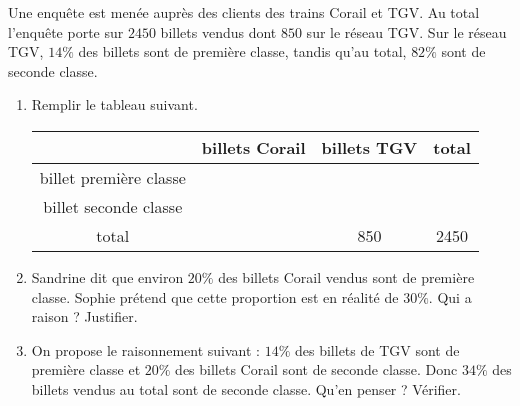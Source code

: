 
\begin{exercice}\label{exosmath-0089}

Une enquête est menée auprès des clients des trains Corail et TGV. Au total l'enquête porte sur \( 2450\) billets vendus dont \( 850\) sur le réseau TGV. Sur le réseau TGV, \( 14\%\) des billets sont de première classe, tandis qu'au total, \( 82\%\) sont de seconde classe.

\begin{enumerate}
    \item
        Remplir le tableau suivant.

\begin{center}
        \begin{tabular}[]{|c||c|c|c|}
            \hline
            &billets Corail&billets TGV& total\\
            \hline\hline
            billet première classe&&&\\
            \hline
            billet seconde classe&&&\\
            \hline
            total&&850&2450\\
            \hline
        \end{tabular}
\end{center}
\item
    Sandrine dit que environ \( 20\%\) des billets Corail vendus sont de première classe. Sophie prétend que cette proportion est en réalité de \( 30\%\). Qui a raison ? Justifier.
\item
    On propose le raisonnement suivant : \( 14\%\) des billets de TGV sont de première classe et \( 20\%\) des billets Corail sont de seconde classe. Donc \( 34\%\) des billets vendus au total sont de seconde classe. Qu'en penser ? Vérifier.
\end{enumerate}

\end{exercice}
